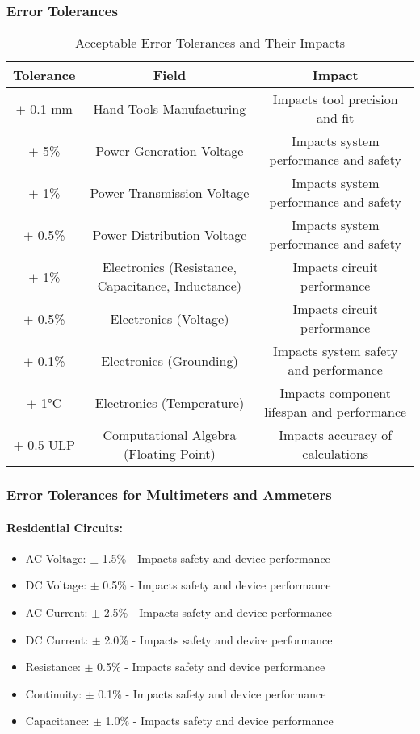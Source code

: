 \newpage
\subsubsection{Error Tolerances}
\begin{table}[ht]
  \centering
  \begin{tabular}{|c|c|c|}
  \hline
  \textbf{Tolerance} & \textbf{Field} & \textbf{Impact} \\
  \hline
  $\pm$ 0.1 mm & Hand Tools Manufacturing & Impacts tool precision and fit \\
  $\pm$ 5\% & Power Generation Voltage & Impacts system performance and safety \\
  $\pm$ 1\% & Power Transmission Voltage & Impacts system performance and safety \\
  $\pm$ 0.5\% & Power Distribution Voltage & Impacts system performance and safety \\
  $\pm$ 1\% & Electronics (Resistance, Capacitance, Inductance) & Impacts circuit performance \\
  $\pm$ 0.5\% & Electronics (Voltage) & Impacts circuit performance \\
  $\pm$ 0.1\% & Electronics (Grounding) & Impacts system safety and performance \\
  $\pm$ 1°C & Electronics (Temperature) & Impacts component lifespan and performance \\
  $\pm$ 0.5 ULP & Computational Algebra (Floating Point) & Impacts accuracy of calculations \\
  \hline
  \end{tabular}
  \caption{Acceptable Error Tolerances and Their Impacts}
  \label{table:tolerances}
  \end{table}

  \newpage
  \subsubsection{Error Tolerances for Multimeters and Ammeters}
  
  \paragraph{Residential Circuits:}
  \begin{itemize}
      \item AC Voltage: $\pm$ 1.5\% - Impacts safety and device performance
      \item DC Voltage: $\pm$ 0.5\% - Impacts safety and device performance
      \item AC Current: $\pm$ 2.5\% - Impacts safety and device performance
      \item DC Current: $\pm$ 2.0\% - Impacts safety and device performance
      \item Resistance: $\pm$ 0.5\% - Impacts safety and device performance
      \item Continuity: $\pm$ 0.1\% - Impacts safety and device performance
      \item Capacitance: $\pm$ 1.0\% - Impacts safety and device performance
  \end{itemize}
  
